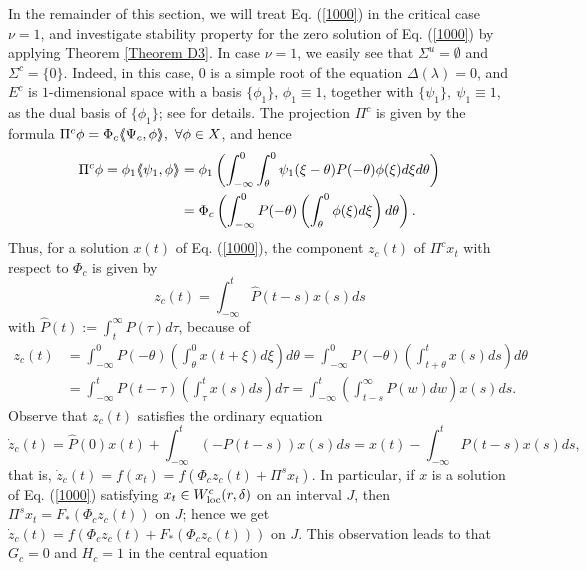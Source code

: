 \documentclass[12pt]{amsart}
\begin{document}
In the remainder of this section, we will treat Eq. (\ref{1000}) in 
the critical case $\nu=1$, and investigate stability property for the 
zero solution of Eq. (\ref{1000}) by applying Theorem \ref{Theorem D3}. 
In case $\nu=1$, we easily see that $\Sigma^u=\emptyset$ and $\Sigma^c=\{0\}$. 
Indeed, in this case, $0$ is a simple root of the equation 
$\Delta(\lambda)=0$, and $E^c$ is $1$-dimensional space with 
a basis $\{\phi_1\}$, $\phi_1\equiv 1$, together with 
$\{\psi_1\},\ \psi_1\equiv 1$, as the dual basis of $\{\phi_1\}$; 
see \cite{murmat} for details.  The projection $\Pi^{c}$ is given 
by the formula $\Pi^c\phi=\Phi_c{\langle\hspace{-1mm}\langle} \Psi_c,\phi {\rangle\hspace{-1mm}\rangle}, \ \forall\phi\in X$, 
and hence 
\begin{align*}
   \Pi^c\phi 
    = \phi_1{\langle\hspace{-1mm}\langle}\psi_1,\phi {\rangle\hspace{-1mm}\rangle}
   &= \phi_1\left(\int_{-\infty}^0\int_{\theta}^0
      \psi_1(\xi-\theta)P(-\theta)\phi(\xi)d\xi d\theta\right)\\
   &= \Phi_c\left(\int_{-\infty}^0P(-\theta)
      \left(\int_{\theta}^0\phi(\xi)d\xi\right)d\theta\right).
\end{align*}
Thus, for a solution $x(t)$ of Eq. (\ref{1000}), the component $z_c(t)$ 
of $\Pi^cx_t$ with respect to $\Phi_c$ is given by
$$
   z_c(t)=\int_{-\infty}^t\hat{P}(t-s)x(s)ds
$$
with $\hat{P}(t):=\int_t^{\infty}P(\tau)d\tau$, because of 
\begin{align*}
   z_c(t)
   &= \int_{-\infty}^0P(-\theta)\left(\int_{\theta}^0x(t+\xi)d\xi\right)d\theta 
    = \int_{-\infty}^0P(-\theta)\left(\int_{t+\theta}^tx(s)ds\right)d\theta \\
   &= \int_{-\infty}^tP(t-\tau)\left(\int_{\tau}^tx(s)ds\right)d\tau 
    = \int_{-\infty}^t\left(\int_{t-s}^{\infty}P(w)dw\right)x(s)ds. 
\end{align*}
Observe that $z_c(t)$ satisfies the ordinary equation 
$$
   \dot{z}_c(t)= \hat{P}(0)x(t)+\int_{-\infty}^t(-P(t-s))x(s)ds
   =x(t)-\int_{-\infty}^tP(t-s)x(s)ds,
$$
that is, 
$
   \dot{z}_c(t)=f(x_t)=f(\Phi_cz_c(t)+\Pi^sx_t). 
$
In particular, if $x$ is a solution of Eq. (\ref{1000}) satisfying 
$x_t\in W^c_{\rm loc}(r,\delta)$ on an interval $J$, then   
$\Pi^sx_t=F_{\ast}(\Phi_cz_c(t))$ on $J$; hence we get  
$
   \dot{z}_c(t)=f(\Phi_cz_c(t)+F_{\ast}(\Phi_cz_c(t)))
$
on $J$.  
This observation leads to that $G_c=0$ and $H_c=1$ in the central equation 
\end{document}
